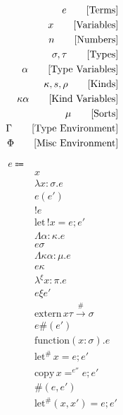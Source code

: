 \documentclass {article}
\begin{document}
\Large

\begin{align*}
e \tag* {[Terms]} \\
x \tag* {[Variables]} \\
n \tag* {[Numbers]} \\
\sigma, \tau \tag* {[Types]} \\
\alpha \tag* {[Type Variables]} \\
\kappa, s, \rho \tag* {[Kinds]} \\
\kappa \alpha \tag*{[Kind Variables]} \\
\mu \tag*{[Sorts]} \\
\Gamma \tag* {[Type Environment]} \\
\Phi \tag* {[Misc Environment]}
\end{align*}

\begin{align*}
e \Coloneqq & \\
& x \tag*{[Variable]}\\
& \lambda x : \sigma. e \tag*{[Macro Lambda]}\\
& e(e') \tag*{[Macro Application]}\\
& !e \tag*{[Bang Introduction]} \\
& \text{let} \, !x = e; e' \tag*{[Bang Elimination]} \\ 
& \Lambda \alpha : \kappa. e \tag*{[Type Lambda]} \\
& e \sigma \tag*{[Type Application]} \\
& \Lambda \kappa \alpha : \mu. e \tag*{[Kind Lambda]} \\
& e \kappa \tag*{[Kind Application]} \\
& \lambda^\xi x : \pi. e \tag*{[Evidence Lambda]} \\
& e \xi e' \tag*{[Evidence Application]} \\
& \text{extern} \, x \tau \xrightarrow{\#} \sigma \tag*{[Extern Symbol]} \\
& e\#(e') \tag*{[Function Pointer Application]} \\
& \text{function} (x : \sigma). e \tag*{[Function Literal]} \\
& \text{let}^\# \, x = e; e' \tag*{[Runtime Let]} \\
& \text{copy} \, x =^{e''} e; e' \tag*{[Runtime Copy Let]} \\
& \#(e, e') \tag*{[Runtime Pair Introduction]} \\
& \text{let}^\# (x, x') = e; e' \tag*{[Runtime Pair Elimination]} \\

\end{align*}
\end{document}
